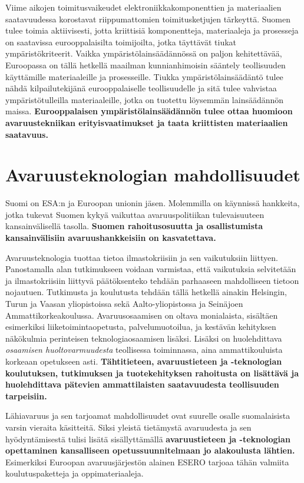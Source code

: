 \documentclass[nobib,finnish,oneside,openany,notoc,a4paper]{tufte-book}
\begin{document}
Viime aikojen toimitusvaikeudet elektroniikkakomponenttien ja
materiaalien saatavuudessa korostavat riippumattomien toimitusketjujen
tärkeyttä. Suomen tulee toimia aktiivisesti, jotta kriittisiä
komponentteja, materiaaleja ja prosesseja on saatavissa eurooppalaisilta
toimijoilta, jotka täyttävät tiukat ympäristökriteerit. Vaikka
ympäristölainsäädännössä on paljon kehitettävää, Euroopassa on tällä
hetkellä maailman kunnianhimoisin sääntely teollisuuden käyttämille
materiaaleille ja prosesseille. Tiukka ympäristölainsäädäntö tulee nähdä
kilpailutekijänä eurooppalaiselle teollisuudelle ja sitä tulee vahvistaa
ympäristötulleilla materiaaleille, jotka on tuotettu löysemmän
lainsäädännön maissa. \textbf{Eurooppalaisen ympäristölainsäädännön
tulee ottaa huomioon avaruustekniikan erityisvaatimukset ja taata
kriittisten materiaalien saatavuus.}

\chapter{Avaruusteknologian mahdollisuudet}

Suomi on ESA:n ja Euroopan unionin jäsen. Molemmilla on käynnissä
hankkeita, jotka tukevat Suomen kykyä vaikuttaa avaruuspolitiikan
tulevaisuuteen kansainvälisellä tasolla. \textbf{Suomen rahoitusosuutta
ja osallistumista kansainvälisiin avaruushankkeisiin on kasvatettava.}

Avaruusteknologia tuottaa tietoa ilmastokriisiin ja sen vaikutuksiin
liittyen. Panostamalla alan tutkimukseen voidaan varmistaa, että
vaikutuksia selvitetään ja ilmastokriisiin liittyvä päätöksenteko
tehdään parhaaseen mahdolliseen tietoon nojautuen. Tutkimusta ja
koulutusta tehdään tällä hetkellä ainakin Helsingin, Turun ja Vaasan
yliopistoissa sekä Aalto-yliopistossa ja Seinäjoen
Ammattikorkeakoulussa. Avaruusosaamisen on oltava monialaista, sisältäen
esimerkiksi liiketoimintaopetusta, palvelumuotoilua, ja kestävän
kehityksen näkökulmia perinteisen teknologiaosaamisen lisäksi. Lisäksi
on huolehdittava \emph{osaamisen huoltovarmuudesta} teollisessa
toiminnassa, aina ammattikouluista korkeaan opetukseen asti.
\textbf{Tähtitieteen, avaruustieteen ja -teknologian koulutuksen,
tutkimuksen ja tuotekehityksen rahoitusta on lisättävä ja huolehdittava
pätevien ammattilaisten saatavuudesta teollisuuden tarpeisiin.}

Lähiavaruus ja sen tarjoamat mahdollisuudet ovat suurelle osalle
suomalaisista varsin vieraita käsitteitä. Siksi yleistä tietämystä
avaruudesta ja sen hyödyntämisestä tulisi lisätä sisällyttämällä
\textbf{avaruustieteen ja -teknologian opettaminen kansalliseen
opetussuunnitelmaan jo alakoulusta lähtien.} Esimerkiksi Euroopan
avaruusjärjestön alainen ESERO tarjoaa tähän valmiita koulutuspaketteja
ja oppimateriaaleja.
\end{document}
